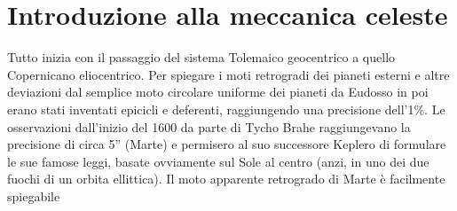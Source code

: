 \documentclass[a4paper, oneside]{book}
\begin{document}
\section{Introduzione alla meccanica celeste}
Tutto inizia con il passaggio del sistema Tolemaico geocentrico a quello 
Copernicano eliocentrico. Per spiegare i moti retrogradi dei pianeti esterni e 
altre deviazioni dal semplice moto circolare uniforme dei pianeti da Eudosso in poi erano
stati inventati epicicli e deferenti, raggiungendo una precisione dell'1\%. Le osservazioni 
dall'inizio del 1600 da parte di Tycho Brahe raggiungevano la precisione di circa 5'' (Marte) e 
permisero al suo successore Keplero di formulare le sue famose
leggi, basate ovviamente sul Sole al centro (anzi, in uno dei due fuochi di un 
orbita ellittica). Il moto apparente retrogrado di Marte è facilmente spiegabile 
\begin{center}
\end{center}
\end{document}
